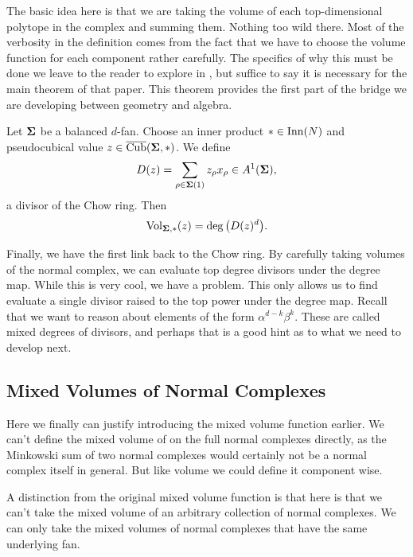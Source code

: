 \documentclass[12pt,oneside]{../../sfsuthesis}
\begin{document}
The basic idea here is that we are taking the volume of each top-dimensional polytope in the complex and summing them.
Nothing too wild there.
Most of the verbosity in the definition comes from the fact that we have to choose the volume function for each component rather carefully.
The specifics of why this must be done we leave to the reader to explore in \cite{nathansonTropicalFansNormal2023}, but suffice to say it is necessary for the main theorem of that paper.
This theorem provides the first part of the bridge we are developing between geometry and algebra.
\begin{theorem}\th\label{thm:volDegCorrespondence}
    Let \( \bm{\Sigma} \) be a balanced \( d \)-fan.
    Choose an inner product \( \ast \in \operatorname{Inn}(N) \) and pseudocubical value \( z  \in \operatorname{\overline{Cub}}( \bm{\Sigma}, \ast ) \).
    We define
    \[
        D(z) = \sum_{\rho \in \bm{\Sigma}(1)} z_\rho x_\rho \in A^1(\bm{\Sigma}),
    \]
    a divisor of the Chow ring.
    Then
    \[
        \operatorname{Vol}_{\bm{\Sigma}, \ast}(z) = \deg\big( D(z)^d \big).
    \]
\end{theorem}

Finally, we have the first link back to the Chow ring.
By carefully taking volumes of the normal complex, we can evaluate top degree divisors under the degree map.
While this is very cool, we have a problem.
This only allows us to find evaluate a single divisor raised to the top power under the degree map.
Recall that we want to reason about elements of the form \( \alpha^{d-k}\beta^k \).
These are called mixed degrees of divisors, and perhaps that is a good hint as to what we need to develop next.

\subsection{Mixed Volumes of Normal Complexes}
Here we finally can justify introducing the mixed volume function earlier.
We can't define the mixed volume of on the full normal complexes directly, as the Minkowski sum of two normal complexes would certainly not be a normal complex itself in general.
But like volume we could define it component wise.

A distinction from the original mixed volume function is that here is that we can't take the mixed volume of an arbitrary collection of normal complexes.
We can only take the mixed volumes of normal complexes that have the same underlying fan.
\end{document}
